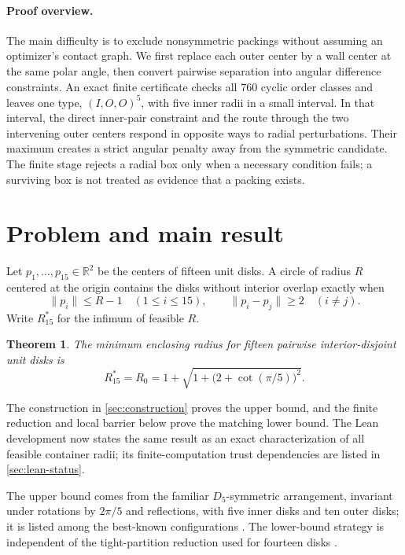 \documentclass[11pt]{article}
\newtheorem{theorem}{Theorem}[section]
\theoremstyle{definition}
\begin{document}
\paragraph{Proof overview.}
The main difficulty is to exclude nonsymmetric packings without assuming an optimizer's contact graph. We first replace each outer center by a wall center at the same polar angle, then convert pairwise separation into angular difference constraints. An exact finite certificate checks all 760 cyclic order classes and leaves one type, $(I,O,O)^5$, with five inner radii in a small interval. In that interval, the direct inner-pair constraint and the route through the two intervening outer centers respond in opposite ways to radial perturbations. Their maximum creates a strict angular penalty away from the symmetric candidate. The finite stage rejects a radial box only when a necessary condition fails; a surviving box is not treated as evidence that a packing exists.

\section{Problem and main result}

Let $p_1,\ldots,p_{15}\in\mathbb R^2$ be the centers of fifteen unit disks. A circle of radius $R$ centered at the origin contains the disks without interior overlap exactly when
\begin{equation}\label{eq:feas}
  \lVert p_i\rVert\le R-1 \quad(1\le i\le15),\qquad
  \lVert p_i-p_j\rVert\ge2 \quad(i\ne j).
\end{equation}
Write $R_{15}^*$ for the infimum of feasible $R$.

\begin{theorem}\label{thm:main}
The minimum enclosing radius for fifteen pairwise interior-disjoint unit disks is
\[
 R_{15}^*=R_0=1+\sqrt{1+\bigl(2+\cot(\pi/5)\bigr)^2}.
\]
\end{theorem}

The construction in \cref{sec:construction} proves the upper bound, and the finite reduction and local barrier below prove the matching lower bound. The Lean development now states the same result as an exact characterization of all feasible container radii; its finite-computation trust dependencies are listed in \cref{sec:lean-status}.

The upper bound comes from the familiar $D_5$-symmetric arrangement, invariant under rotations by $2\pi/5$ and reflections, with five inner disks and ten outer disks; it is listed among the best-known configurations \cite{GrahamEtAl1998,Packomania}. The lower-bound strategy is independent of the tight-partition reduction used for fourteen disks \cite{EF2024}.
\end{document}
